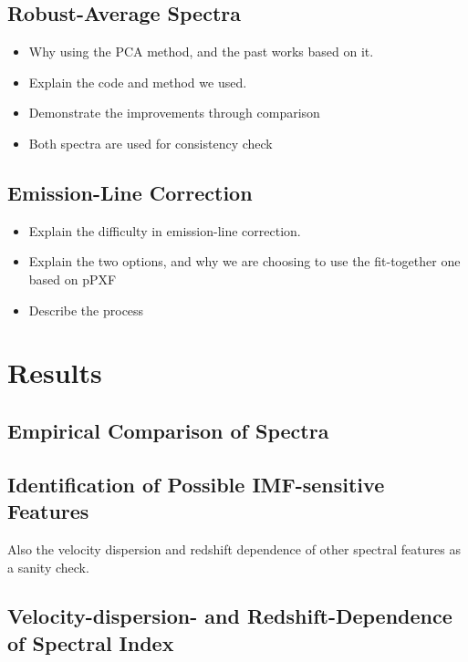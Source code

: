 \documentclass[preprint]{aastex}
\begin{document}
\begin{CJK*}{UTF8}{gbsn}
\subsection{Robust-Average Spectra} 

\begin{itemize}
  \item Why using the PCA method, and the past works based on it.  
  \item Explain the code and method we used.
  \item Demonstrate the improvements through comparison 
  \item Both spectra are used for consistency check 
\end{itemize}
  
\subsection{Emission-Line Correction} 

\begin{itemize}
    \item Explain the difficulty in emission-line correction.  
    \item Explain the two options, and why we are choosing to use the fit-together
    one based on pPXF 
    \item Describe the process 
\end{itemize}

\section{Results}

\subsection{Empirical Comparison of Spectra}

\subsection{Identification of Possible IMF-sensitive Features} 

Also the velocity dispersion and redshift dependence of other spectral 
  features as a sanity check. 

\subsection{Velocity-dispersion- and Redshift-Dependence of Spectral Index}



\end{CJK*}
\end{document}
